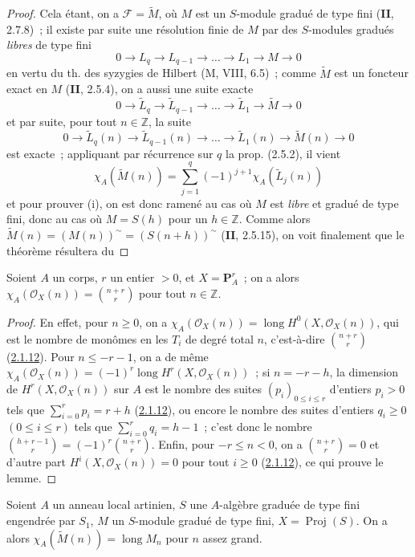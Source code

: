 \begin{proof}
Cela étant, on a $\mathcal F=\widetilde M$, où $M$ est un $S$-module
gradué de type fini (\textbf{II}, 2.7.8)~; il existe par suite une résolution finie
de $M$ par des $S$-modules gradués \emph{libres} de type fini
\[
0\to L_q\to L_{q-1}\to\ldots\to L_1\to M\to0
\]
en vertu du th. des syzygies de Hilbert (M, VIII, 6.5)~; comme
$\widetilde M$ est un foncteur exact en $M$ (\textbf{II}, 2.5.4), on a
aussi une suite exacte
\[
0\to\widetilde L_q\to\widetilde L_{q-1}\to\ldots
\to\widetilde L_1\to\widetilde M\to0
\]
et par suite, pour tout $n\in\mathbb Z$, la suite
\[
0\to\widetilde L_q(n)\to\widetilde L_{q-1}(n)\to\ldots
\to\widetilde L_1(n)\to\widetilde M(n)\to0
\]
est exacte~; appliquant par récurrence sur $q$ la prop. (2.5.2), il vient
\[
\chi_A(\widetilde M(n))=\sum_{j=1}^{q}(-1)^{j+1}
\chi_A(\widetilde L_j(n))
\]
et pour prouver (i), on est donc ramené au cas où $M$ est \emph{libre} et gradué
de type fini, donc au cas où $M=S(h)$ pour un $h\in\mathbb Z$. Comme
alors $\widetilde M(n)=(M(n))^\sim=(S(n+h))^\sim$ (\textbf{II}, 2.5.15), on voit
finalement que le théorème résultera du
\end{proof}

\begin{lemma}[2.5.3.1]
\label{III.2.5.3.1-fr}
Soient $A$ un corps, $r$ un entier $>0$, et $X=\mathbf P_A^r$~; on a
alors
$\chi_A(\mathcal O_X(n))=\binom{n+r}{r}$
pour tout $n\in\mathbb Z$.
\end{lemma}

\begin{proof}
En effet, pour $n\geq0$, on a
$\chi_A(\mathcal O_X(n))=\operatorname{long}H^0(X,\mathcal O_X(n))$, qui
est le nombre de monômes en les $T_i$ de degré total $n$, c'est-à-dire
$\binom{n+r}{r}$ (\hyperref[III.2.1.12-fr]{2.1.12}). Pour
$n\leq-r-1$, on a de même
$\chi_A(\mathcal O_X(n))=(-1)^r
\operatorname{long}H^r(X,\mathcal O_X(n))$~;
si $n=-r-h$, la dimension de $H^r(X,\mathcal O_X(n))$ sur $A$ est le
nombre des suites $(p_i)_{0\leq i\leq r}$ d'entiers $p_i>0$ tels que
$\sum_{i=0}^{r}p_i=r+h$ (\hyperref[III.2.1.12-fr]{2.1.12}), ou encore le
nombre des suites d'entiers $q_i\geq0$ $(0\leq i\leq r)$ tels que
$\sum_{i=0}^{r}q_i=h-1$~; c'est donc le nombre
$\binom{h+r-1}{r}=(-1)^r\binom{n+r}{r}$.
Enfin, pour $-r\leq n<0$, on a $\binom{n+r}{r}=0$ et d'autre part
$H^i(X,\mathcal O_X(n))=0$ pour tout $i\geq0$
(\hyperref[III.2.1.12-fr]{2.1.12}), ce qui prouve le lemme.
\end{proof}

\begin{corollary}[2.5.4]
\label{III.2.5.4-fr}
Soient $A$ un anneau local artinien, $S$ une $A$-algèbre graduée de type
fini engendrée par $S_1$, $M$ un $S$-module gradué de type fini,
$X=\operatorname{Proj}(S)$. On a alors
$\chi_A(\widetilde M(n))=\operatorname{long}M_n$
pour $n$ assez grand.
\end{corollary}

